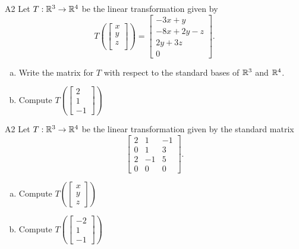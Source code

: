 \begin{problem}{A2}
Let $T: \mathbb{R}^3\rightarrow \mathbb{R}^4$ be the linear transformation given by $$T\left(\begin{bmatrix} x \\ y \\ z \\  \end{bmatrix} \right) = \begin{bmatrix} -3x+y \\ -8x+2y-z \\ 2y+3z \\ 0 \end{bmatrix}.$$  
\begin{enumerate}[(a)]
\item Write the matrix for $T$ with respect to the standard bases of $\mathbb{R}^3$ and $\mathbb{R}^4$.
\item Compute \(T\left( \begin{bmatrix} 2 \\ 1 \\ -1 \end{bmatrix}\right)\)
\end{enumerate}
\end{problem}

\begin{problem}{A2}
Let $T: \mathbb{R}^3\rightarrow \mathbb{R}^4$ be the linear transformation given by the standard matrix
\[ \begin{bmatrix}
2 & 1 & -1 \\ 0 & 1 & 3 \\ 2 & -1 & 5 \\ 0 & 0 & 0 
\end{bmatrix}. \]
\begin{enumerate}[(a)]
\item Compute \( T\left( \begin{bmatrix}x\\ y \\ z \end{bmatrix} \right) \)
\item Compute \(T\left( \begin{bmatrix} -2 \\ 1 \\ -1 \end{bmatrix}\right)\)
\end{enumerate}
\end{problem}

